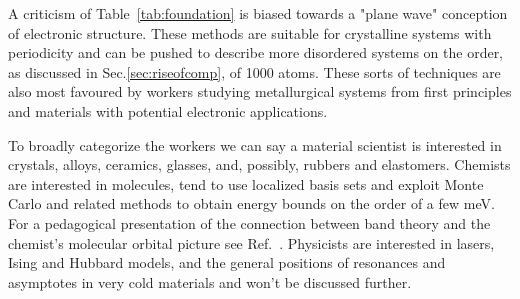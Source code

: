 \begin{table}
\caption{Citations are relevant up to Nov. 2017. Citations are according 
to the journals in which they appear. 
The actual number of citations are much higher. 
\label{tab:theoreticalpapers}}
\end{table}

A criticism of Table~\ref{tab:foundation} is biased towards a "plane wave" 
conception of electronic structure. 
These methods are suitable for crystalline systems with periodicity and can be pushed 
to describe more disordered systems on the order, as discussed in Sec.\ref{sec:riseofcomp}, 
of 1000 atoms. These sorts of techniques are also most favoured by workers studying metallurgical
systems from first principles and materials with potential electronic applications.

To broadly categorize the workers we can say a material scientist 
is interested in crystals, alloys, ceramics, glasses, and, possibly, rubbers and elastomers. 
Chemists are interested in molecules, 
tend to use localized basis sets and exploit Monte Carlo and 
related methods to obtain energy bounds on the order of a few meV. 
For a pedagogical presentation of the connection between band 
theory and the chemist's molecular orbital picture 
see Ref.~\cite{hoffman87}. Physicists are interested in lasers, 
Ising and Hubbard models, and the general positions of resonances 
and asymptotes in very cold materials and won't be discussed further. 

